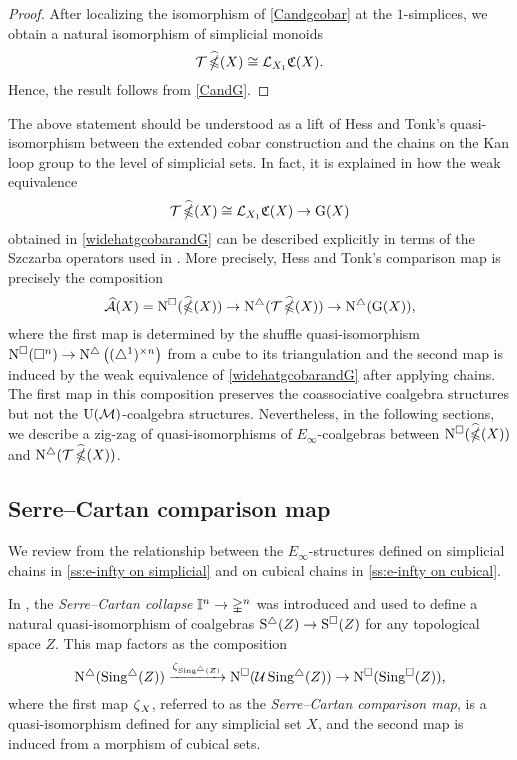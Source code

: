 \begin{proof}
	After localizing the isomorphism of \cref{Candgcobar} at the $1$-simplices, we obtain a natural isomorphism of simplicial monoids
	\[
	\mathcal{T} \operatorname{\widehat{\mathbb{\Omega}}}(X) \cong \operatorname{\mathcal{L}}_{X_1} \! \operatorname{\mathfrak{C}}(X).
	\]
	Hence, the result follows from \cref{CandG}.
\end{proof}

 The above statement should be understood as a lift of Hess and Tonk's quasi-isomorphism between the extended cobar construction and the chains on the Kan loop group to the level of simplicial sets.
In fact, it is explained in \cite{minichello2021path} how the weak equivalence
\[
\mathcal{T} \operatorname{\widehat{\mathbb{\Omega}}}(X) \cong \mathcal{L}_{X_1} \! \operatorname{\mathfrak{C}}(X) \to \operatorname{G}(X)
\]
obtained in \cref{widehatgcobarandG}
 can be described explicitly in terms of the Szczarba operators used in \cite{hess2010cobar}.
More precisely, Hess and Tonk's comparison map is precisely the composition
\[
\operatorname{\mathcal{\widehat{A}}}(X) = \operatorname{N^{\square}}(\operatorname{\widehat{\mathbb{\Omega}}}(X)) \to \operatorname{N^{\triangle}}(\mathcal{T}\operatorname{\widehat{\mathbb{\Omega}}}(X)) \to \operatorname{N^{\triangle}} (\operatorname{G}(X)),
\]
where the first map is determined by the shuffle quasi-isomorphism
$\operatorname{N^{\square}}(\square^n)\to \operatorname{N^{\triangle}} \big( (\triangle^1)^{\times n} \big)$ from a cube to its triangulation and the second map is induced by the weak equivalence of \cref{widehatgcobarandG} after applying chains.
The first map in this composition preserves the coassociative coalgebra structures but not the ${\operatorname{U}(\mathcal{M})}$-coalgebra structures.
Nevertheless, in the following sections, we describe a zig-zag of quasi-isomorphisms of $E_{\infty}$-coalgebras between $\operatorname{N^{\square}}(\operatorname{\widehat{\mathbb{\Omega}}}(X))$ and $\operatorname{N^{\triangle}}(\mathcal{T}\operatorname{\widehat{\mathbb{\Omega}}}(X))$.

\subsection{Serre--Cartan comparison map}

We review from \cite{medina2021cubical} the relationship between the $E_\infty$-structures defined on simplicial chains in \cref{ss:e-infty on simplicial} and on cubical chains in \cref{ss:e-infty on cubical}.

In \cite[p.442]{serre1951homologie}, the \textit{Serre--Cartan collapse} $\mathbb{I}^n \to \mathbb{\Delta}^n$ was introduced and used to define a natural quasi-isomorphism of coalgebras $\operatorname{S^{\triangle}}(Z) \to \operatorname{S^{\square}}(Z)$ for any topological space $Z$.
This map factors as the composition
\[
\operatorname{N^{\triangle}}(\operatorname{Sing^{\triangle}}(Z)) \xrightarrow{\operatorname{\zeta}_{\operatorname{Sing^{\triangle}}(Z)}}
\operatorname{N^{\square}}(\mathcal{U} \operatorname{Sing^{\triangle}}(Z)) \to
\operatorname{N^{\square}}(\operatorname{Sing^{\square}}(Z)),
\]
where the first map $\operatorname{\zeta}_X$, referred to as the \textit{Serre--Cartan comparison map}, is a quasi-isomorphism defined for any simplicial set $X$, and the second map is induced from a morphism of cubical sets.


